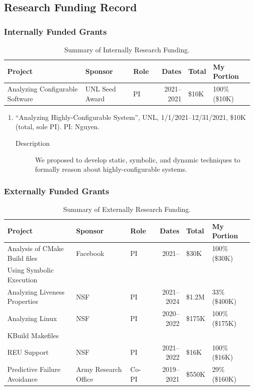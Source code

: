 \documentclass[10pt]{article}
\begin{document}
\subsection{Research Funding Record}

\subsubsection{Internally Funded Grants}
\begin{table}[htbp]
  \caption{\label{tab:internalfunding}Summary of Internally Research Funding.}
  \small
  \centering
  \begin{tabular}{lllrll}
    \toprule
    Project & Sponsor & Role & Dates & Total & My Portion\\
    \midrule
    Analyzing Configurable Software   & UNL Seed Award & PI & 2021--2021 & \$10K & 100\% (\$10K)\\
    \bottomrule
  \end{tabular}
\end{table}

\begin{enumerate}
\item ``Analyzing Highly-Configurable System'', UNL, 1/1/2021--12/31/2021, \$10K (total, sole PI). PI: Nguyen.
  \begin{description}
  \item[Description] We proposed to develop static, symbolic, and dynamic techniques to formally reason about highly-configurable systems.  
  \end{description}
\end{enumerate}

\subsubsection{Externally Funded Grants}

\begin{table}[htbp]
  \caption{\label{tab:externalfunding}Summary of Externally Research Funding.}
  \small
  \centering
  \begin{tabular}{lllrll}
    \toprule
    Project & Sponsor & Role & Dates & Total & My Portion\\
    \midrule
    Analysis of CMake Build files & Facebook & PI & 2021-- & \$30K & 100\% (\$30K)\\
    Using Symbolic Execution &&&&&\\
    \midrule
    Analyzing Liveness Properties & NSF & PI & 2021--2024 & \$1.2M & 33\% (\$400K)\\
    \midrule
    Analyzing Linux & NSF & PI & 2020--2022 & \$175K & 100\% (\$175K)\\
    KBuild Makefiles &  &  &  &  & \\
    REU Support & NSF & PI & 2021--2022 & \$16K & 100\% (\$16K)\\
    \midrule
    Predictive Failure Avoidance & Army Research Office & Co-PI & 2019--2021 & \$550K & 29\% (\$160K)\\
    \bottomrule
  \end{tabular}
\end{table}
\end{document}
